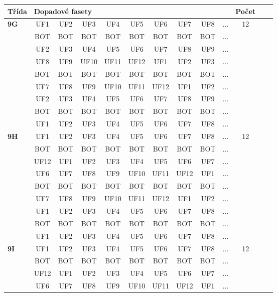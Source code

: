 \clearpage

\begin{table}[h!]
\centering
\begin{tabular}{|l|c|c|c|c|c|c|c|c|c|c|c|c|}
\hline
Třída &  \multicolumn{9}{l}{Dopadové fasety} \vline  & Počet\\
\hline \hline
\textbf{9G} & UF1 & UF2 & UF3 & UF4 & UF5 & UF6 & UF7 & UF8 & $\dots$ & 12\\
 & BOT & BOT & BOT & BOT & BOT & BOT & BOT & BOT & $\dots$ & \\
 & UF2 & UF3 & UF4 & UF5 & UF6 & UF7 & UF8 & UF9 & $\dots$ & \\
 & UF8 & UF9 & UF10 & UF11 & UF12 & UF1 & UF2 & UF3 & $\dots$ & \\
 & BOT & BOT & BOT & BOT & BOT & BOT & BOT & BOT & $\dots$ & \\
 & UF7 & UF8 & UF9 & UF10 & UF11 & UF12 & UF1 & UF2 & $\dots$ & \\
 & UF2 & UF3 & UF4 & UF5 & UF6 & UF7 & UF8 & UF9 & $\dots$ & \\
 & BOT & BOT & BOT & BOT & BOT & BOT & BOT & BOT & $\dots$ & \\
 & UF1 & UF2 & UF3 & UF4 & UF5 & UF6 & UF7 & UF8 & $\dots$ & \\
\hline \hline
\textbf{9H} & UF1 & UF2 & UF3 & UF4 & UF5 & UF6 & UF7 & UF8 & $\dots$ & 12\\
 & BOT & BOT & BOT & BOT & BOT & BOT & BOT & BOT & $\dots$ & \\
 & UF12 & UF1 & UF2 & UF3 & UF4 & UF5 & UF6 & UF7 & $\dots$ & \\
 & UF6 & UF7 & UF8 & UF9 & UF10 & UF11 & UF12 & UF1 & $\dots$ & \\
 & BOT & BOT & BOT & BOT & BOT & BOT & BOT & BOT & $\dots$ & \\
 & UF7 & UF8 & UF9 & UF10 & UF11 & UF12 & UF1 & UF2 & $\dots$ & \\
 & UF1 & UF2 & UF3 & UF4 & UF5 & UF6 & UF7 & UF8 & $\dots$ & \\
 & BOT & BOT & BOT & BOT & BOT & BOT & BOT & BOT & $\dots$ & \\
 & UF1 & UF2 & UF3 & UF4 & UF5 & UF6 & UF7 & UF8 & $\dots$ & \\
\hline \hline
\textbf{9I} & UF1 & UF2 & UF3 & UF4 & UF5 & UF6 & UF7 & UF8 & $\dots$ & 12\\
 & BOT & BOT & BOT & BOT & BOT & BOT & BOT & BOT & $\dots$ & \\
 & UF12 & UF1 & UF2 & UF3 & UF4 & UF5 & UF6 & UF7 & $\dots$ & \\
 & UF6 & UF7 & UF8 & UF9 & UF10 & UF11 & UF12 & UF1 & $\dots$ & \\

\end{tabular}
\end{table}
